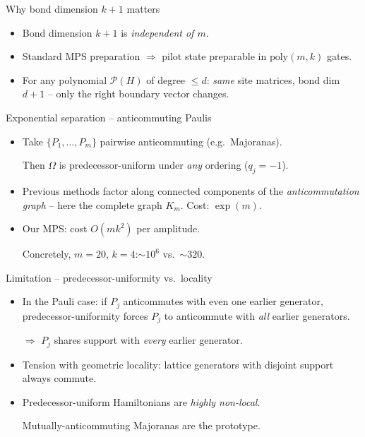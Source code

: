 \documentclass{beamer}
\renewcommand{\>}{\rangle}
\newcommand{\<}{\langle}
\newcommand{\calP}{\mathcal{P}}
\begin{document}
\begin{frame}{Why bond dimension $k+1$ matters}

\begin{itemize}
    \item Bond dimension $k+1$ is \emph{independent of $m$}.

    \bigskip
    \item Standard MPS preparation $\Rightarrow$ pilot state preparable
    in $\mathrm{poly}(m, k)$ gates.

    \bigskip
    \item For any polynomial $\calP(H)$ of degree $\le d$:
    \emph{same} site matrices, bond dim $d+1$ -- only the right boundary
    vector changes.

\end{itemize}
\end{frame}


\begin{frame}{Exponential separation -- anticommuting Paulis}

\begin{itemize}
    \item Take $\{P_1,\ldots,P_m\}$ pairwise anticommuting (e.g.\ Majoranas).

    \medskip
    Then $\Omega$ is predecessor-uniform under \emph{any} ordering
    ($q_j = -1$).

    \bigskip
    \item Previous methods factor along connected components of the
    \emph{anticommutation graph} -- here the complete graph $K_m$.\;\;
    Cost: $\exp(m)$.

    \bigskip
    \item Our MPS: cost $O(mk^2)$ per amplitude.

    \medskip
    Concretely, $m=20$, $k=4$:\;\;$\sim 10^6$ vs.\ $\sim 320$.
\end{itemize}
\end{frame}


\begin{frame}{Limitation -- predecessor-uniformity vs.\ locality}

\begin{itemize}
    \item In the Pauli case: if $P_j$ anticommutes with even one earlier
    generator, predecessor-uniformity forces $P_j$ to anticommute with
    \emph{all} earlier generators.

    \medskip
    $\Rightarrow$ $P_j$ shares support with \emph{every} earlier generator.

    \bigskip
    \item Tension with geometric locality: lattice generators with
    disjoint support always commute.

    \bigskip
    \item Predecessor-uniform Hamiltonians are \emph{highly non-local}.

    \medskip
    Mutually-anticommuting Majoranas are the prototype.
\end{itemize}
\end{frame}
\end{document}
